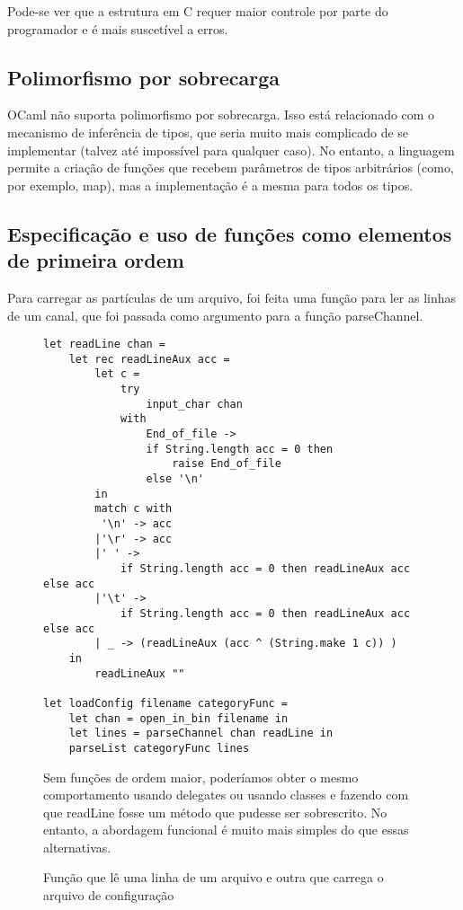 \documentclass[a4paper,10pt]{article}
\begin{document}
	Pode-se ver que a estrutura em C requer maior controle por parte do programador e é mais suscetível a erros.
	
\subsection{Polimorfismo por sobrecarga}
	
	OCaml não suporta polimorfismo por sobrecarga. Isso está relacionado com o mecanismo de inferência de tipos, que seria muito mais complicado de se implementar (talvez até impossível para qualquer caso). No entanto, a linguagem permite a criação de funções que recebem parâmetros de tipos arbitrários (como, por exemplo, map), mas a implementação é a mesma para todos os tipos.

\subsection{Especificação e uso de funções como elementos de primeira ordem}
	\label{ElementosPrimeiraOrdem}
	Para carregar as partículas de um arquivo, foi feita uma função para ler as linhas de um canal, que foi passada como argumento para a função parseChannel.
	
	\begin{figure}[H]
	\centering	
	\begin{lstlisting}
let readLine chan =
	let rec readLineAux acc =
		let c =
			try
				input_char chan
			with
				End_of_file ->
				if String.length acc = 0 then
					raise End_of_file
				else '\n'
		in
		match c with
		 '\n' -> acc
		|'\r' -> acc
		|' ' ->
			if String.length acc = 0 then readLineAux acc else acc
		|'\t' ->
			if String.length acc = 0 then readLineAux acc else acc
		| _ -> (readLineAux (acc ^ (String.make 1 c)) )
	in
		readLineAux ""
		
let loadConfig filename categoryFunc =
	let chan = open_in_bin filename in
	let lines = parseChannel chan readLine in
	parseList categoryFunc lines
	\end{lstlisting}
	\caption{Função que lê uma linha de um arquivo e outra que carrega o arquivo de configuração}
	
	Sem funções de ordem maior, poderíamos obter o mesmo comportamento usando delegates ou usando classes e fazendo com que readLine fosse um método que pudesse ser sobrescrito. No entanto, a abordagem funcional é muito mais simples do que essas alternativas.
	
\end{figure}
	
\end{document}
